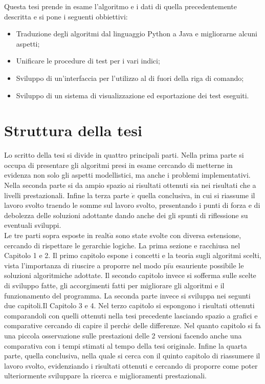 Questa tesi prende in esame l'algoritmo e i dati di quella precedentemente descritta e si pone i seguenti obbiettivi:
\begin{itemize}
\item Traduzione degli algoritmi dal linguaggio Python a Java e migliorarne alcuni aspetti;
\item Unificare le procedure di test per i vari indici;
\item Sviluppo di un'interfaccia per l'utilizzo al di fuori della riga di comando;
\item Sviluppo di un sistema di visualizzazione ed esportazione dei test eseguiti.
\end{itemize}

\section{Struttura della tesi}
Lo scritto della tesi si divide in quattro principali parti.
Nella prima parte si occupa di presentare gli algoritmi presi in esame cercando di metterne in evidenza
non solo gli aspetti modellistici, ma anche i problemi implementativi.
Nella seconda parte si da ampio spazio ai risultati ottenuti sia nei risultati che a livelli
prestazionali.
Infine la terza parte $\grave{e}$ quella conclusiva, in cui si riassume il lavoro svolto traendo
le somme sul lavoro svolto, presentando i punti di forza e di debolezza delle soluzioni
adottante dando anche dei gli spunti di riflessione su eventuali sviluppi.\\

Le tre parti sopra esposte in realt$\grave{a}$ sono state svolte con diversa estensione,
cercando di rispettare le gerarchie logiche.
La prima sezione e racchiusa nel Capitolo 1 e 2.
Il primo capitolo espone i concetti e la teoria sugli algoritmi scelti, vista l'importanza di
riuscire a proporre nel modo pi$\grave{u}$ esauriente possibile le soluzioni algoritmiche
adottate. Il secondo capitolo invece si sofferma sulle scelte di sviluppo fatte, gli accorgimenti fatti per migliorare
gli algoritmi e il funzionamento del programma.
La seconda parte invece si sviluppa nei segunti due capitoli.Il Capitolo 3 e 4.
Nel terzo capitolo si espongono i risultati ottenuti comparandoli con quelli
ottenuti nella tesi precedente lasciando spazio a grafici e comparative cercando
di capire il perch$\acute{e}$ delle differenze.
Nel quanto capitolo si fa una piccola osservazione sulle prestazioni delle 2 versioni
facendo anche una comparativa con i tempi stimati al tempo della tesi originale.
Infine la quarta parte, quella conclusiva, nella quale si cerca con il quinto capitolo
di riassumere il lavoro svolto, evidenziando i risultati ottenuti e cercando
di proporre come poter ulteriormente sviluppare la ricerca e miglioramenti prestazionali.
